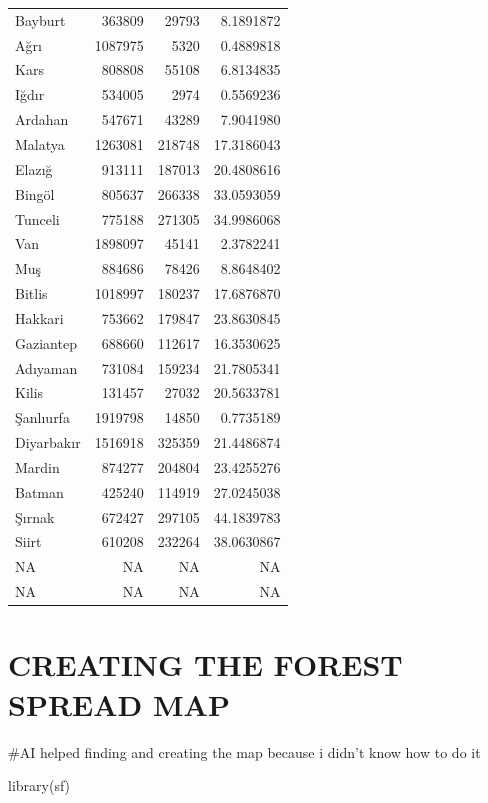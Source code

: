 \documentclass[
  11pt,
  a4paper,
  DIV=11,
  numbers=noendperiod]{scrartcl}
\newenvironment{Shaded}{\begin{snugshade}}{\end{snugshade}}
\newcommand{\FunctionTok}[1]{\textcolor[rgb]{0.28,0.35,0.67}{#1}}
\newcommand{\NormalTok}[1]{\textcolor[rgb]{0.00,0.23,0.31}{#1}}
\begin{document}
{\begin{longtable}[]{@{}lrrr@{}}
Bayburt & 363809 & 29793 & 8.1891872 \\
Ağrı & 1087975 & 5320 & 0.4889818 \\
Kars & 808808 & 55108 & 6.8134835 \\
Iğdır & 534005 & 2974 & 0.5569236 \\
Ardahan & 547671 & 43289 & 7.9041980 \\
Malatya & 1263081 & 218748 & 17.3186043 \\
Elazığ & 913111 & 187013 & 20.4808616 \\
Bingöl & 805637 & 266338 & 33.0593059 \\
Tunceli & 775188 & 271305 & 34.9986068 \\
Van & 1898097 & 45141 & 2.3782241 \\
Muş & 884686 & 78426 & 8.8648402 \\
Bitlis & 1018997 & 180237 & 17.6876870 \\
Hakkari & 753662 & 179847 & 23.8630845 \\
Gaziantep & 688660 & 112617 & 16.3530625 \\
Adıyaman & 731084 & 159234 & 21.7805341 \\
Kilis & 131457 & 27032 & 20.5633781 \\
Şanlıurfa & 1919798 & 14850 & 0.7735189 \\
Diyarbakır & 1516918 & 325359 & 21.4486874 \\
Mardin & 874277 & 204804 & 23.4255276 \\
Batman & 425240 & 114919 & 27.0245038 \\
Şırnak & 672427 & 297105 & 44.1839783 \\
Siirt & 610208 & 232264 & 38.0630867 \\
NA & NA & NA & NA \\
NA & NA & NA & NA \\
\end{longtable}
}

\section{CREATING THE FOREST SPREAD
MAP}\label{creating-the-forest-spread-map}

\#AI helped finding and creating the map because i didn't know how to do
it

\begin{Shaded}
\begin{Highlighting}[]
\FunctionTok{library}\NormalTok{(sf)}
\end{Highlighting}
\end{Shaded}
\end{document}
